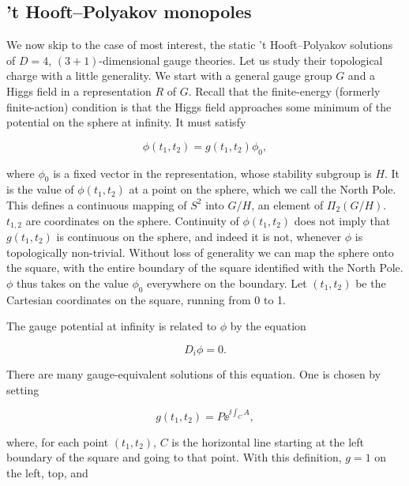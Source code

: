 \subsection{'t Hooft--Polyakov monopoles}

We now skip to the case of most interest, the static 't Hooft--Polyakov
solutions of $D=4$, $(3+1)$-dimensional gauge theories. Let us study their topological
charge with a little generality. We start with a general gauge group $G$ and a
Higgs field in a representation $R$ of $G$. Recall that the finite-energy
(formerly finite-action) condition is that the Higgs field approaches some
minimum of the potential on the sphere at infinity. It must satisfy

\[
  \phi(t_1,t_2)=g(t_1,t_2)\phi_0,
\]

where $\phi_0$ is a fixed vector in the representation, whose stability
subgroup is $H$. It is the value of $\phi(t_1,t_2)$ at a point on the sphere,
which we call the North Pole. This defines a continuous mapping of $S^2$ into
$G/H$, an element of $\Pi_2(G/H)$. $t_{1,2}$ are coordinates on the sphere.
Continuity of $\phi(t_1,t_2)$ does not imply that $g(t_1,t_2)$ is continuous
on the sphere, and indeed it is not, whenever $\phi$ is topologically
non-trivial. Without loss of generality we can map the sphere onto the square,
with the entire boundary of the square identified with the North Pole. $\phi$
thus takes on the value $\phi_0$ everywhere on the boundary. Let $(t_1,t_2)$
be the Cartesian coordinates on the square, running from 0 to 1.

The gauge potential at infinity is related to $\phi$ by the equation

\[
  D_i\phi=0.
\]

There are many gauge-equivalent solutions of this equation. One is chosen by
setting

\[
  g(t_1,t_2)=P\ee^{\ii\int_C A},
\]

where, for each point $(t_1,t_2)$, $C$ is the horizontal line starting at the
left boundary of the square and going to that point. With this definition,
$g=1$ on the left, top, and

\setcounter{footnote}{10}
